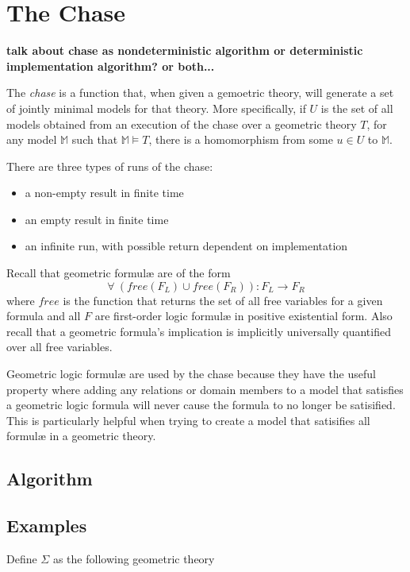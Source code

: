 \section{The Chase}

	\textbf{talk about chase as nondeterministic algorithm or deterministic implementation algorithm? or both...}

	The \emph{chase} is a function that, when given a gemoetric theory, will
	generate a set of jointly minimal models for that theory. More
	specifically, if $U$ is the set of all models obtained from an execution of
	the chase over a geometric theory $T$, for any model $\mathbb{M}$ such that
	$\mathbb{M} \models T$, there is a homomorphism from some $u \in U$ to
	$\mathbb{M}$.

	There are three types of runs of the chase:
	\begin{itemize}
	\item a non-empty result in finite time
	\item an empty result in finite time
	\item an infinite run, with possible return dependent on implementation
	\end{itemize}

	Recall that geometric formul{\ae} are of the form
	\[\forall\ (free(F_L) \cup free(F_R)) : F_L \to F_R\]
	where $free$ is the function that returns the set of all free variables for
	a given formula and all $F$ are first-order logic formul{\ae} in positive
	existential form. Also recall that a geometric formula's implication is
	implicitly universally quantified over all free variables.

	Geometric logic formul{\ae} are used by the chase because they have the
	useful property where adding any relations or domain members to a model
	that satisfies a geometric logic formula will never cause the formula to no
	longer be satisified. This is particularly helpful when trying to create a
	model that satisifies all formul{\ae} in a geometric theory.

	\subsection{Algorithm}

	\subsection{Examples}

		Define $\Sigma$ as the following geometric theory

